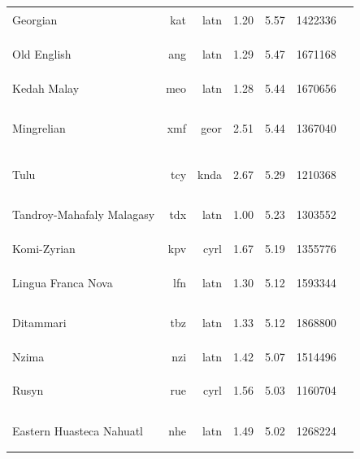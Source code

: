 \documentclass[11pt]{article}
\begin{document}
\begin{center}
\begin{longtable}[width=0.9\textwidth]{|lrrrrrl|}
Georgian & kat & latn & 1.20 & 5.57 & 1422336 & {\color{glot500}\rule{4.0cm}{8pt}} \\ 
Old English & ang & latn & 1.29 & 5.47 & 1671168 & {\color{madlad400}\rule{3.69cm}{8pt}}{\color{other}\rule{0.31000000000000005cm}{8pt}} \\ 
Kedah Malay & meo & latn & 1.28 & 5.44 & 1670656 & {\color{madlad400}\rule{4.0cm}{8pt}} \\ 
Mingrelian & xmf & geor & 2.51 & 5.44 & 1367040 & {\color{oscar}\rule{0.55cm}{8pt}}{\color{glot500}\rule{1.96cm}{8pt}}{\color{other}\rule{1.4900000000000002cm}{8pt}} \\ 
Tulu & tcy & knda & 2.67 & 5.29 & 1210368 & {\color{madlad400}\rule{1.78cm}{8pt}}{\color{other}\rule{2.2199999999999998cm}{8pt}} \\ 
Tandroy-Mahafaly Malagasy & tdx & latn & 1.00 & 5.23 & 1303552 & {\color{madlad400}\rule{1.12cm}{8pt}}{\color{other}\rule{2.88cm}{8pt}} \\ 
Komi-Zyrian & kpv & cyrl & 1.67 & 5.19 & 1355776 & {\color{other}\rule{4.0cm}{8pt}} \\ 
Lingua Franca Nova & lfn & latn & 1.30 & 5.12 & 1593344 & {\color{glot500}\rule{2.04cm}{8pt}}{\color{other}\rule{1.96cm}{8pt}} \\ 
Ditammari & tbz & latn & 1.33 & 5.12 & 1868800 & {\color{madlad400}\rule{2.15cm}{8pt}}{\color{other}\rule{1.85cm}{8pt}} \\ 
Nzima & nzi & latn & 1.42 & 5.07 & 1514496 & {\color{madlad400}\rule{4.0cm}{8pt}} \\ 
Rusyn & rue & cyrl & 1.56 & 5.03 & 1160704 & {\color{glot500}\rule{2.06cm}{8pt}}{\color{other}\rule{1.94cm}{8pt}} \\ 
Eastern Huasteca Nahuatl & nhe & latn & 1.49 & 5.02 & 1268224 & {\color{madlad400}\rule{2.25cm}{8pt}}{\color{other}\rule{1.75cm}{8pt}} \\ 
\end{longtable}
\end{center}
\end{document}

